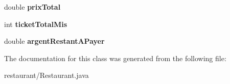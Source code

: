 \begin{DoxyCompactItemize}
\item 
double {\bfseries prix\+Total}\hypertarget{classrestaurant_1_1_restaurant_ab4e40ae563d550f431f1581283bf92b5}{}\label{classrestaurant_1_1_restaurant_ab4e40ae563d550f431f1581283bf92b5}

\item 
int {\bfseries ticket\+Total\+Mis}\hypertarget{classrestaurant_1_1_restaurant_aa69855aa2035ac6ee4fd9bd18989e7f1}{}\label{classrestaurant_1_1_restaurant_aa69855aa2035ac6ee4fd9bd18989e7f1}

\item 
double {\bfseries argent\+Restant\+A\+Payer}\hypertarget{classrestaurant_1_1_restaurant_aab2cab1e5303fca05ae54a5e533eafc8}{}\label{classrestaurant_1_1_restaurant_aab2cab1e5303fca05ae54a5e533eafc8}

\end{DoxyCompactItemize}


The documentation for this class was generated from the following file\+:\begin{DoxyCompactItemize}
\item 
restaurant/Restaurant.\+java\end{DoxyCompactItemize}
